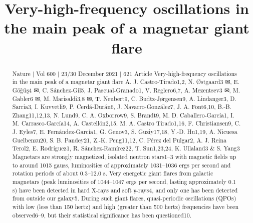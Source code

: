 \title{Very-high-frequency oscillations in the main peak of a magnetar giant flare}

\maketitle

\begin{abstract}
Nature | Vol 600 | 23/30 December 2021 | 621 Article Very-high-frequency oscillations in the main peak of a magnetar giant flare A. J. Castro-Tirado1,2, N. Østgaard3 ✉, E. Göǧüş4 ✉, C. Sánchez-Gil5, J. Pascual-Granado1, V. Reglero6,7, A. Mezentsev3 ✉, M. Gabler6 ✉, M. Marisaldi3,8 ✉, T. Neubert9, C. Budtz-Jørgensen9, A. Lindanger3, D. Sarria3, I. Kuvvetli9, P. Cerdá-Durán6, J. Navarro-González7, J. A. Font6,10, B.-B. Zhang11,12,13, N. Lund9, C. A. Oxborrow9, S. Brandt9, M. D. Caballero-García1, I. M. Carrasco-García14, A. Castellón2,15, M. A. Castro Tirado1,16, F. Christiansen9, C. J. Eyles7, E. Fernández-García1, G. Genov3, S. Guziy17,18, Y.-D. Hu1,19, A. Nicuesa Guelbenzu20, S. B. Pandey21, Z.-K. Peng11,12, C. Pérez del Pulgar2, A. J. Reina Terol2, E. Rodríguez1, R. Sánchez-Ramírez22, T. Sun1,23,24, K. Ullaland3 \& S. Yang3 Magnetars are strongly magnetized, isolated neutron stars1–3 with magnetic fields up to around 1015 gauss, luminosities of approximately 1031–1036 ergs per second and rotation periods of about 0.3–12.0 s. Very energetic giant flares from galactic magnetars (peak luminosities of 1044–1047 ergs per second, lasting approximately 0.1 s) have been detected in hard X-rays and soft γ-rays4, and only one has been detected from outside our galaxy5. During such giant flares, quasi-periodic oscillations (QPOs) with low (less than 150 hertz) and high (greater than 500 hertz) frequencies have been observed6–9, but their statistical significance has been questioned10. 
\end{abstract}

